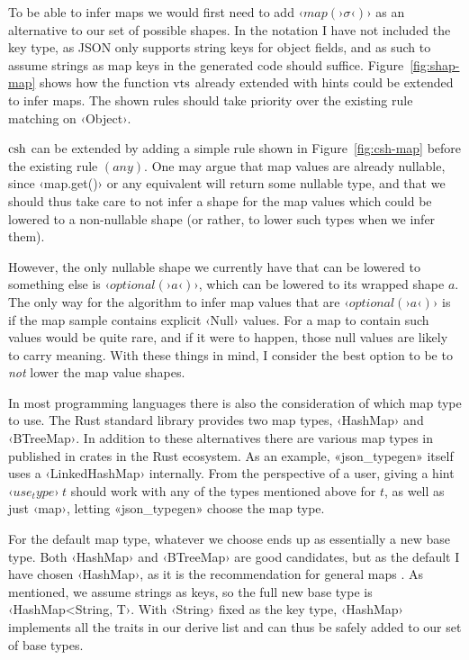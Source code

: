To be able to infer maps we would first need to add $‹map(›\sigma‹)›$ as an alternative to our set of possible shapes. In the notation I have not included the key type, as JSON only supports string keys for object fields, and as such to assume strings as map keys in the generated code should suffice. Figure~\ref{fig:shap-map} shows how the function $\operatorname{vts}$ already extended with hints could be extended to infer maps. The shown rules should take priority over the existing rule matching on ‹Object›.

$\operatorname{csh}$ can be extended by adding a simple rule shown in Figure~\ref{fig:csh-map} before the existing rule $(any)$. One may argue that map values are already nullable, since ‹map.get()› or any equivalent will return some nullable type, and that we should thus take care to not infer a shape for the map values which could be lowered to a non-nullable shape (or rather, to lower such types when we infer them).

However, the only nullable shape we currently have that can be lowered to something else is $‹optional(›a‹)›$, which can be lowered to its wrapped shape $a$. The only way for the algorithm to infer map values that are $‹optional(›a‹)›$ is if the map sample contains explicit ‹Null› values. For a map to contain such values would be quite rare, and if it were to happen, those null values are likely to carry meaning. With these things in mind, I consider the best option to be to \emph{not} lower the map value shapes.

In most programming languages there is also the consideration of which map type to use. The Rust standard library provides two map types, ‹HashMap› and ‹BTreeMap›. In addition to these alternatives there are various map types in published in crates in the Rust ecosystem. As an example, «json_typegen» itself uses a ‹LinkedHashMap› internally. From the perspective of a user, giving a hint $‹use_type›\ t$ should work with any of the types mentioned above for $t$, as well as just ‹map›, letting «json_typegen» choose the map type.

For the default map type, whatever we choose ends up as essentially a new base type. Both ‹HashMap› and ‹BTreeMap› are good candidates, but as the default I have chosen ‹HashMap›, as it is the recommendation for general maps \cite[std::collections]{rust-std-docs}. As mentioned, we assume strings as keys, so the full new base type is ‹HashMap<String, T›. With ‹String› fixed as the key type, ‹HashMap› implements all the traits in our derive list and can thus be safely added to our set of base types.

